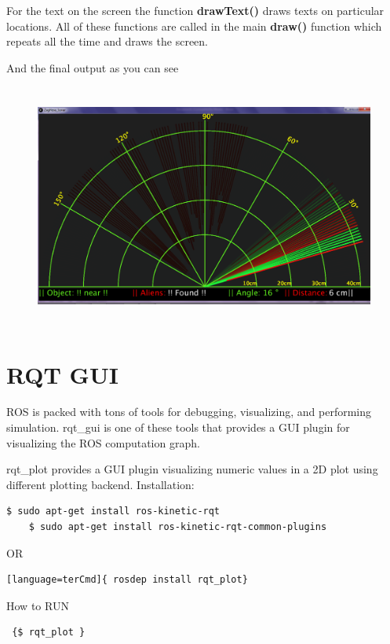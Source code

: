 For the text on the screen the function \textbf{drawText()} draws texts on particular locations. All of these functions are called in the main \textbf{draw()} function which repeats all the time and draws the screen. 

And the final output as you can see 
\begin{figure}[H]
	\centering
	\includegraphics[width=14cm,height=8cm]{figures/sonar6}
\end{figure}

\section{RQT GUI}
ROS is packed with tons of tools for debugging, visualizing, and performing simulation. 
rqt\_gui is one of these tools that provides a GUI plugin for visualizing the ROS computation graph.

rqt\_plot provides a GUI plugin visualizing numeric values in a 2D plot using different plotting backend.
Installation:
\begin{lstlisting}[language=terCmd]
	$ sudo apt-get install ros-kinetic-rqt
	$ sudo apt-get install ros-kinetic-rqt-common-plugins
\end{lstlisting}

OR
\begin{lstlisting}
[language=terCmd]{ rosdep install rqt_plot} 
\end{lstlisting}
How to RUN
\begin{lstlisting}
 {$ rqt_plot }
\end{lstlisting}

